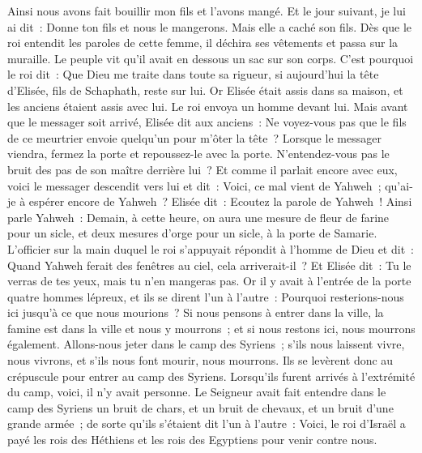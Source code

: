 \begin{multicols}{2}
Ainsi nous avons fait bouillir mon fils et l'avons mangé. Et le jour suivant, je lui ai dit~: Donne ton fils et nous le mangerons. Mais elle a caché son fils.
Dès que le roi entendit les paroles de cette femme, il déchira ses vêtements et passa sur la muraille. Le peuple vit qu'il avait en dessous un sac sur son corps.
C'est pourquoi le roi dit~: Que Dieu me traite dans toute sa rigueur, si aujourd'hui la tête d'Elisée, fils de Schaphath, reste sur lui.
Or Elisée était assis dans sa maison, et les anciens étaient assis avec lui. Le roi envoya un homme devant lui. Mais avant que le messager soit arrivé, Elisée dit aux anciens~: Ne voyez-vous pas que le fils de ce meurtrier envoie quelqu'un pour m'ôter la tête~? Lorsque le messager viendra, fermez la porte et repoussez-le avec la porte. N'entendez-vous pas le bruit des pas de son maître derrière lui~?
Et comme il parlait encore avec eux, voici le messager descendit vers lui et dit~: Voici, ce mal vient de Yahweh~; qu'ai-je à espérer encore de Yahweh~?
\VerseOne{}Elisée dit~: Ecoutez la parole de Yahweh~! Ainsi parle Yahweh~: Demain, à cette heure, on aura une mesure de fleur de farine pour un sicle, et deux mesures d'orge pour un sicle, à la porte de Samarie.
L'officier sur la main duquel le roi s'appuyait répondit à l'homme de Dieu et dit~: Quand Yahweh ferait des fenêtres au ciel, cela arriverait-il~? Et Elisée dit~: Tu le verras de tes yeux, mais tu n'en mangeras pas.
Or il y avait à l'entrée de la porte quatre hommes lépreux, et ils se dirent l'un à l'autre~: Pourquoi resterions-nous ici jusqu'à ce que nous mourions~?
Si nous pensons à entrer dans la ville, la famine est dans la ville et nous y mourrons~; et si nous restons ici, nous mourrons également. Allons-nous jeter dans le camp des Syriens~; s'ils nous laissent vivre, nous vivrons, et s'ils nous font mourir, nous mourrons.
Ils se levèrent donc au crépuscule pour entrer au camp des Syriens. Lorsqu'ils furent arrivés à l'extrémité du camp, voici, il n'y avait personne.
Le Seigneur avait fait entendre dans le camp des Syriens un bruit de chars, et un bruit de chevaux, et un bruit d'une grande armée~; de sorte qu'ils s'étaient dit l'un à l'autre~: Voici, le roi d'Israël a payé les rois des Héthiens et les rois des Egyptiens pour venir contre nous.

\end{multicols}
